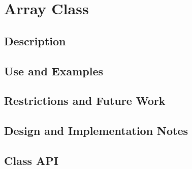 \documentclass[english]{article}
\begin{document}
\section{Array Class}
\subsection{Description}

%
%
\subsection{Use and Examples}












\subsection{Restrictions and Future Work}

\subsection{Design and Implementation Notes}

\subsection{Class API}

\mbox{}\hrulefill
\mbox{}\hrulefill
\mbox{}\hrulefill
\mbox{}\hrulefill
\mbox{}\hrulefill
\mbox{}\hrulefill
\end{document}
